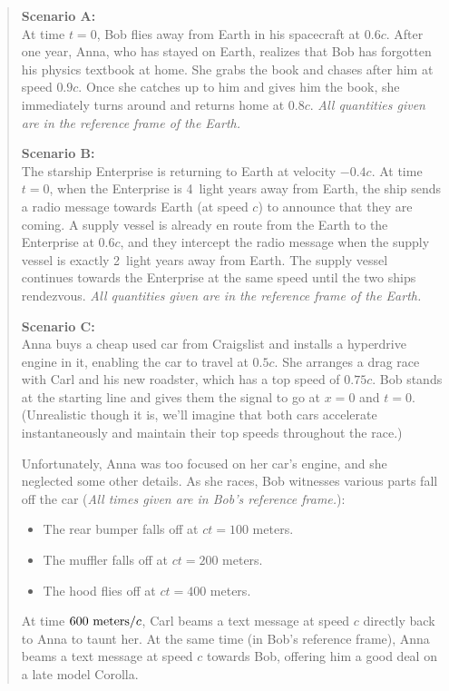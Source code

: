 \begin{quote}

\textbf{Scenario A:}\\
At time $t=0$, Bob flies away from Earth in his spacecraft at $0.6 c$.  After one year, Anna, who has stayed on Earth, realizes that Bob has forgotten his physics textbook at home.  She grabs the book and chases after him at speed $0.9 c$.  Once she catches up to him and gives him the book, she immediately turns around and returns home at $0.8 c$.  \textit{All quantities given are in the reference frame of the Earth.}
\bigskip

\textbf{Scenario B:}\\
The starship Enterprise is returning to Earth at velocity $-0.4 c$.  At time $t=0$, when the Enterprise is 4~light years away from Earth, the ship sends a radio message towards Earth (at speed $c$) to announce that they are coming.  A supply vessel is already en route from the Earth to the Enterprise at $0.6 c$, and they intercept the radio message when the supply vessel is exactly 2~light years away from Earth.  The supply vessel continues towards the Enterprise at the same speed until the two ships rendezvous. \textit{All quantities given are in the reference frame of the Earth.}
\bigskip

\textbf{Scenario C:}\\
Anna buys a cheap used car from Craigslist and installs a hyperdrive engine in it, enabling the car to travel at $0.5 c$.  She arranges a drag race with Carl and his new roadster, which has a top speed of $0.75 c$.  Bob stands at the starting line and gives them the signal to go at $x=0$ and $t=0$.  (Unrealistic though it is, we'll imagine that both cars accelerate instantaneously and maintain their top speeds throughout the race.)

Unfortunately, Anna was too focused on her car's engine, and she neglected some other details.  As she races, Bob witnesses various parts fall off the car (\textit{All times given are in Bob's reference frame.}): 
\begin{itemize}[nosep]
\item The rear bumper falls off at $ct=100$ meters. 
\item The muffler falls off at $ct=200$ meters.
\item The hood flies off at $ct=400$ meters.
\end{itemize}  
At time $600~{\rm meters}/c$, Carl beams a text message at speed $c$ directly back to Anna to taunt her.  At the same time (in Bob's reference frame), Anna beams a text message at speed $c$ towards Bob, offering him a good deal on a late model Corolla.

\end{quote}

